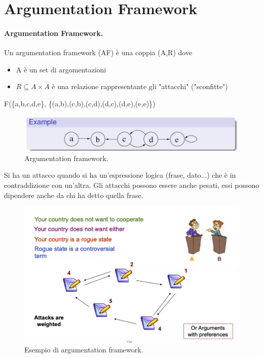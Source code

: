 \section{Argumentation Framework}
\paragraph{Argumentation Framework.}Un argumentation framework (AF) è una coppia (A,R) dove 
\begin{itemize}
    \item A è un set di argomentazioni 
    \item $R \subseteq  A\times  A$ è una relazione rappresentante gli "attacchi" ("sconfitte")
\end{itemize}

\begin{center}
    F(\{a,b,c,d,e\}, \{(a,b),(c,b),(c,d),(d,c),(d,e),(e,e)\})
\end{center}
\begin{figure}[H]
    \centering
    \includegraphics[width=12cm, keepaspectratio]{img/arg_fram.png}
    \caption{Argumentation framework.}\label{fig:arg_fram}
\end{figure}
Si ha un attacco quando si ha un'espressione logica (frase, dato...) che è in contraddizione con un'altra. Gli attacchi possono essere anche pesati, essi possono dipendere anche da chi ha detto quella frase.
\begin{figure}[H]
    \centering
    \includegraphics[width=12cm, keepaspectratio]{img/es_arg_fram.png}
    \caption{Esempio di argumentation framework.}\label{fig:es_arg_fram}
\end{figure}
